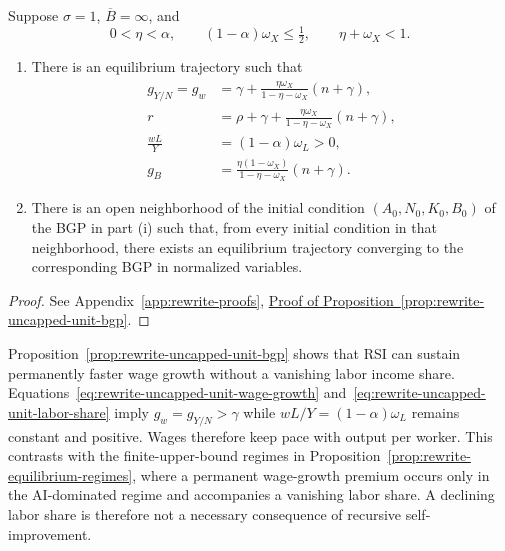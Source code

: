 \begin{proposition}
\label{prop:rewrite-uncapped-unit-bgp}
\label{prop:rewrite-uncapped-unit-local}
Suppose $\sigma=1$, $\overline B=\infty$, and
\begin{equation}
 0<\eta<\alpha,\qquad
 (1-\alpha)\omega_X\leq\tfrac12,\qquad \eta+\omega_X<1.
 \label{eq:rewrite-uncapped-unit-sufficient}
\end{equation}
\begin{enumerate}[label=(\roman*),leftmargin=*]
\item There is an equilibrium trajectory such that
\begin{align}
 g_{Y/N}=g_w& =\gamma+\frac{\eta\omega_X}{1-\eta-\omega_X}(n+\gamma),
 \label{eq:rewrite-uncapped-unit-wage-growth}\\
 r&=\rho+\gamma+\frac{\eta\omega_X}{1-\eta-\omega_X}(n+\gamma),
 \label{eq:rewrite-uncapped-unit-return}\\
 \frac{wL}{Y}&=(1-\alpha)\omega_L>0,
 \label{eq:rewrite-uncapped-unit-labor-share}\\
 g_B&=\frac{\eta(1-\omega_X)}{1-\eta-\omega_X}(n+\gamma).
 \label{eq:rewrite-uncapped-unit-efficiency-growth}
\end{align}
\item There is an open neighborhood of the initial condition
$(A_0,N_0,K_0,B_0)$ of the BGP in part (i) such that, from every initial
condition in that neighborhood, there exists an equilibrium trajectory
converging to the corresponding BGP in normalized variables.
\end{enumerate}
\end{proposition}
\begin{proof}
See Appendix~\ref{app:rewrite-proofs},
\hyperref[proof:rewrite-uncapped-unit-bgp]{Proof of
Proposition~\ref*{prop:rewrite-uncapped-unit-bgp}}.
\end{proof}

Proposition~\ref{prop:rewrite-uncapped-unit-bgp} shows that RSI can sustain
permanently faster wage growth without a vanishing labor income share.
Equations~\eqref{eq:rewrite-uncapped-unit-wage-growth}
and~\eqref{eq:rewrite-uncapped-unit-labor-share} imply
$g_w=g_{Y/N}>\gamma$ while $wL/Y=(1-\alpha)\omega_L$ remains
constant and positive. Wages therefore keep pace with output per
worker. This contrasts with the finite-upper-bound regimes in
Proposition~\ref{prop:rewrite-equilibrium-regimes}, where a permanent
wage-growth premium occurs only in the AI-dominated regime and accompanies
a vanishing labor share. A declining labor share is therefore not a
necessary consequence of recursive self-improvement.

